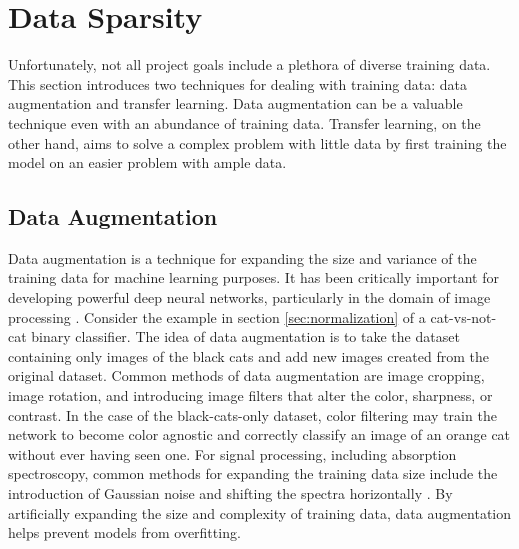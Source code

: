 \section{Data Sparsity}
Unfortunately, not all project goals include a plethora of diverse training data. This section introduces two techniques for dealing with training data: data augmentation and transfer learning. Data augmentation can be a valuable technique even with an abundance of training data. Transfer learning, on the other hand, aims to solve a complex problem with little data by first training the model on an easier problem with ample data.

\subsection{Data Augmentation}
Data augmentation is a technique for expanding the size and variance of the training data for machine learning purposes. It has been critically important for developing powerful deep neural networks, particularly in the domain of image processing \cite{data-augmentation1}\cite{data-augmentation2} \cite{data-augmentation3} \cite{data-augmentation4}. Consider the example in section \ref{sec:normalization} of a cat-vs-not-cat binary classifier. The idea of data augmentation is to take the dataset containing only images of the black cats and add new images created from the original dataset. Common methods of data augmentation are image cropping, image rotation, and introducing image filters that alter the color, sharpness, or contrast. In the case of the black-cats-only dataset, color filtering may train the network to become color agnostic and correctly classify an image of an orange cat without ever having seen one. For signal processing, including absorption spectroscopy, common methods for expanding the training data size include the introduction of Gaussian noise and shifting the spectra horizontally \cite{data-augmentation5}. By artificially expanding the size and complexity of training data, data augmentation helps prevent models from overfitting.

